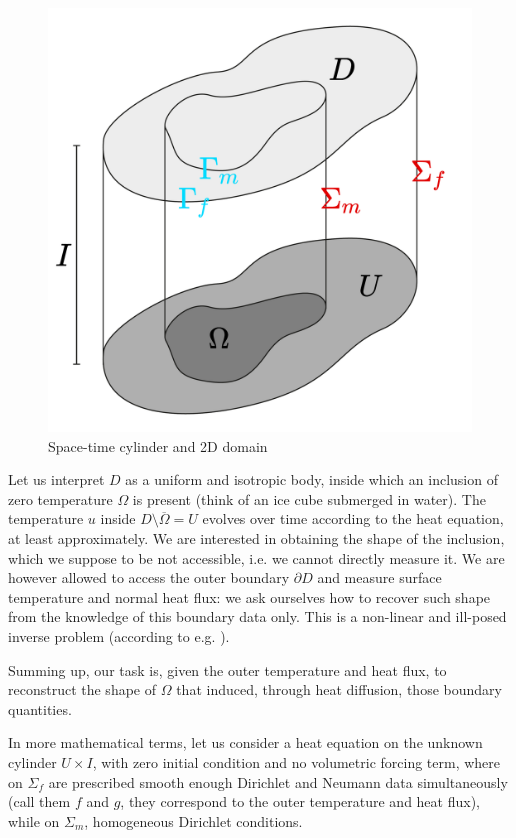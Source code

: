 \documentclass[english,a4paper,9pt,oneside]{scrbook}	%
\theoremstyle{break}
\theoremstyle{remark}
\begin{document}
\begin{figure}[H]
\centering
\includegraphics[height=0.25\columnwidth]{Images/Domains.pdf}
\caption{Space-time cylinder and 2D domain}\label{fig:space_time}
\end{figure}

Let us interpret $D$ as a uniform and isotropic body, inside which an inclusion of zero temperature $\Omega$ is present (think of an ice cube submerged in water). The temperature $u$ inside $D\setminus \overline{\Omega} = U$ evolves over time according to the heat equation, at least approximately. We are interested in obtaining the shape of the inclusion, which we suppose to be not accessible, i.e. we cannot directly measure it. We are however allowed to access the outer boundary $\partial D$ and measure surface temperature and normal heat flux: we ask ourselves how to recover such shape from the knowledge of this boundary data only. This is a non-linear and ill-posed inverse problem (according to e.g. \cite{harbrecht}). 

Summing up, our task is, given the outer temperature and heat flux, to reconstruct the shape of $\Omega$ that induced, through heat diffusion, those boundary quantities.

In more mathematical terms, let us consider a heat equation on the unknown cylinder $U\times I$, with zero initial condition and no volumetric forcing term, where on $\Sigma_f$ are prescribed smooth enough Dirichlet and Neumann data simultaneously (call them $f$ and $g$, they correspond to the outer temperature and heat flux), while on $\Sigma_m$, homogeneous Dirichlet conditions.
\end{document}
